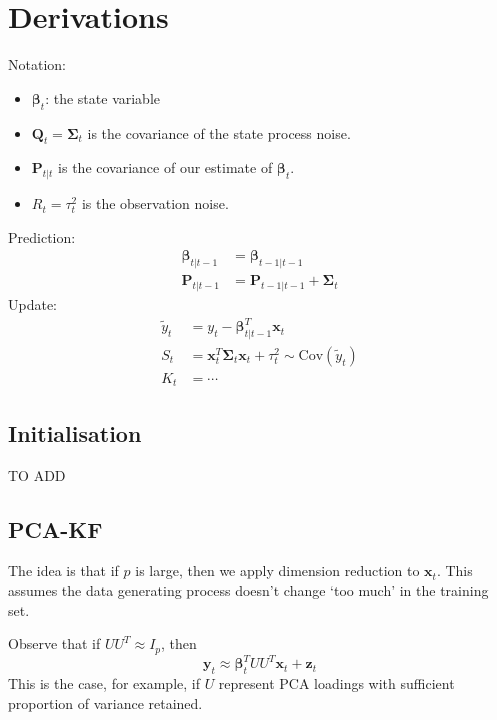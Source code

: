 \section{Derivations}
Notation: 
\begin{itemize}
    \item $\bm{\beta}_t$: the state variable
    \item $\bm{Q}_t=\bm{\Sigma}_t$ is the covariance of the state process noise. 
    \item $\bm{P}_{t|t}$ is the covariance of our estimate of $\bm{\beta}_t$.
    \item $R_{t}=\tau_t^2$ is the observation noise.
\end{itemize}
Prediction:
\begin{align*}
    \bm{\beta}_{t|t-1}&=\bm{\beta}_{t-1|t-1}\\
    \bm{P}_{t|t-1}&=\bm{P}_{t-1|t-1}+\bm{\Sigma}_{t}
\end{align*}
Update:
\begin{align*}
    \tilde{y}_t&=y_t-\bm{\beta}_{t|t-1}^T\bm{x}_t\\
    S_t&=\bm{x}_t^T\bm{\Sigma}_t\bm{x}_t+\tau_t^2\sim \mathrm{Cov}(\tilde{y}_t)\\
    K_t&=\cdots
\end{align*}
\subsection{Initialisation}
TO ADD
\subsection{PCA-KF}
The idea is that if $p$ is large, then we apply dimension reduction to $\bm{x}_t$. This assumes the data generating process doesn't change `too much' in the training set.

Observe that if $UU^T\approx I_p$, then
\[\bm{y}_t\approx\bm{\beta}_t^TUU^T\bm{x}_t+\bm{z}_t\]
This is the case, for example, if $U$ represent PCA loadings with sufficient proportion of variance retained. 
